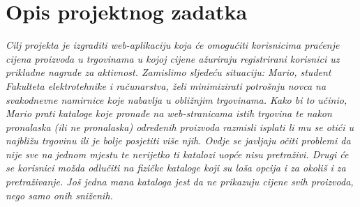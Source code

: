 \chapter{Opis projektnog zadatka}
		
		
		
		\textit{Cilj projekta je izgraditi web-aplikaciju koja će omogućiti korisnicima praćenje cijena proizvoda u trgovinama u kojoj cijene ažuriraju registrirani korisnici uz prikladne nagrade za aktivnost. Zamislimo sljedeću situaciju: Mario, student Fakulteta elektrotehnike i računarstva, želi minimizirati potrošnju novca na svakodnevne namirnice koje nabavlja u obližnjim trgovinama. Kako bi to učinio, Mario prati kataloge koje pronađe na web-stranicama istih trgovina te nakon pronalaska (ili ne pronalaska) određenih proizvoda razmisli isplati li mu se otići u najbližu trgovinu ili je bolje posjetiti više njih. Ovdje se javljaju očiti problemi da nije sve na jednom mjestu te nerijetko ti katalozi uopće nisu pretraživi. Drugi će se korisnici možda odlučiti na fizičke kataloge koji su loša opcija i za okoliš i za pretraživanje. Još jedna mana kataloga jest da ne prikazuju cijene svih proizvoda, nego samo onih sniženih.}\\
		
